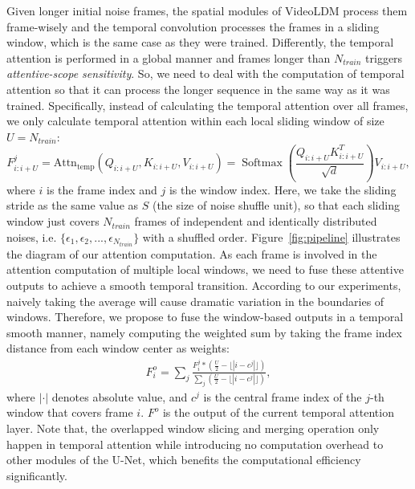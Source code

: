Given longer initial noise frames, the spatial modules of VideoLDM process them frame-wisely and the temporal convolution processes the frames in a sliding window, which is the same case as they were trained. Differently, the temporal attention is performed in a global manner and frames longer than $N_{train}$ triggers \textit{attentive-scope sensitivity}. So, we need to deal with the computation of temporal attention so that it can process the longer sequence in the same way as it was trained.
Specifically, instead of calculating the temporal attention over all frames, we only calculate temporal attention within each local sliding window of size $U=N_{train}$:
%
\begin{equation}
F^{j}_{i:i+U} = \mathrm{Attn}_{\text{temp}}(Q_{i:i+U}, K_{i:i+U}, V_{i:i+U})=\operatorname{Softmax}\left(\frac{Q_{i:i+U} K_{i:i+U}^T}{\sqrt{d}}\right) V_{i:i+U},
\end{equation}
where $i$ is the frame index and $j$ is the window index. Here, we take the sliding stride as the same value as $S$ (the size of noise shuffle unit), so that each sliding window just covers $N_{train}$ frames of independent and identically distributed noises, i.e. $\{\epsilon_1, \epsilon_2, ..., \epsilon_{N_{train}}\}$ with a shuffled order. Figure~\ref{fig:pipeline} illustrates the diagram of our attention computation.
As each frame is involved in the attention computation of multiple local windows, we need to fuse these attentive outputs to achieve a smooth temporal transition. According to our experiments, naively taking the average will cause dramatic variation in the boundaries of windows. Therefore, we propose to fuse the window-based outputs in a temporal smooth manner, namely computing the weighted sum by taking the frame index distance from each window center as weights:
%
\begin{gather}
F^{o}_{i} = \sum_{j} \frac{F^{j}_{i} * (\frac{U}{2} - \lfloor| i-c^{j}|\rfloor)}{\sum_{j} (\frac{U}{2} - \lfloor| i-c^{j}|\rfloor)},
\end{gather}
%
where $|\cdot|$ denotes absolute value, and $c^j$ is the central frame index of the $j$-th window that covers frame $i$. $F^{o}$ is the output of the current temporal attention layer. Note that, the overlapped window slicing and merging operation only happen in temporal attention while introducing no computation overhead to other modules of the U-Net, which benefits the computational efficiency significantly.


